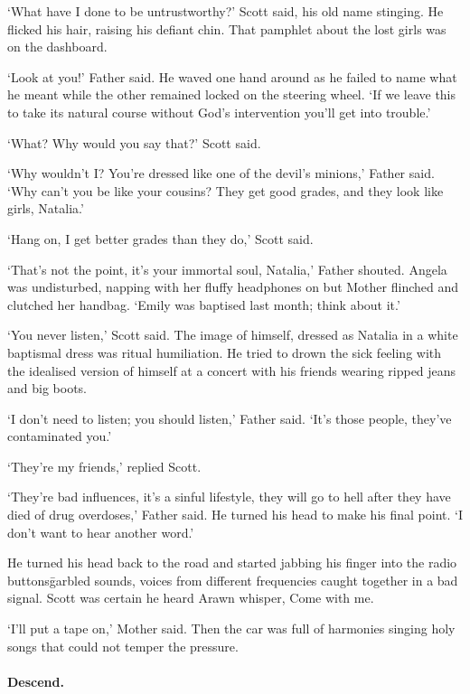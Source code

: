`What have I done to be untrustworthy?' Scott said, his old name
stinging. He flicked his hair, raising his defiant chin. That pamphlet
about the lost girls was on the dashboard.

`Look at you!' Father said. He waved one hand around as he failed to
name what he meant while the other remained locked on the steering
wheel. `If we leave this to take its natural course without God's
intervention you'll get into trouble.'

`What? Why would you say that?' Scott said.

`Why wouldn't I? You're dressed like one of the devil's minions,'
Father said. `Why can't you be like your cousins? They get good
grades, and they look like girls, Natalia.'

`Hang on, I get better grades than they do,' Scott said.

`That's not the point, it's your immortal soul, Natalia,' Father
shouted. Angela was undisturbed, napping with her fluffy headphones on
but Mother flinched and clutched her handbag. `Emily was baptised
last month; think about it.'

`You never listen,' Scott said. The image of himself, dressed as
Natalia in a white baptismal dress was ritual humiliation. He tried to
drown the sick feeling with the idealised version of himself at a
concert with his friends wearing ripped jeans and big boots.

`I don't need to listen; you should listen,' Father said. `It's
those people, they've contaminated you.'

`They're my friends,' replied Scott.

`They're bad influences, it's a sinful lifestyle, they will go to
hell after they have died of drug overdoses,' Father said. He turned
his head to make his final point. `I don't want to hear another
word.'

He turned his head back to the road and started jabbing his finger
into the radio buttons\=garbled sounds, voices from different
frequencies caught together in a bad signal. Scott was certain he
heard Arawn whisper, Come with me.

`I'll put a tape on,' Mother said. Then the car was full of
harmonies singing holy songs that could not temper the pressure.

\paragraph{Descend.}

